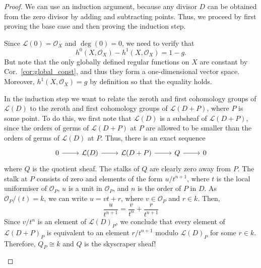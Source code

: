 \documentclass[12pt]{article}
\begin{document}
\begin{proof}
  We can use an induction argument, because any divisor $D$ can be
  obtained from the zero divisor by adding and subtracting points.
  Thus, we proceed by first proving the base case and then proving
  the induction step.

  \begin{description}[style=nextline]
    \item[base case$\big)$]
          Since $\mathcal{L}(0)=\mathscr{O}_{X}$ and $\deg(0)=0$,
          we need to verify that
          \[h^{0}(X, \mathscr{O}_{X})-h^{1}(X, \mathscr{O}_{X})=1-g.\]
          But note that the only globally defined regular functions
          on $X$ are constant by Cor.~\ref{cor:global_const},
          and thus they form a one-dimensional vector space.
          Moreover, $h^{1}(X, \mathscr{O}_{X})=g$ by definition
          so that the equality holds.
    \item[induction step$\big)$]
          In the induction step we want to relate the zeroth and first
          cohomology groups of $\mathcal{L}(D)$ to the zeroth and
          first cohomology groups of $\mathcal{L}(D+P)$, where
          $P$ is some point. To do this, we first note that
          $\mathcal{L}(D)$ is a subsheaf of $\mathcal{L}(D+P)$, since
          the orders of germs of $\mathcal{L}(D+P)$ at $P$ are allowed to
          be smaller than the orders of germs of $\mathcal{L}(D)$ at $P$.
          Thus, there is an exact sequence
          \[
          \begin{tikzcd}
            0\arrow{r} & \mathcal{L}(D)\arrow{r} & \mathcal{L}(D+P)\arrow{r}
            & Q\arrow{r} & 0
          \end{tikzcd}
          \]
          where $Q$ is the quotient sheaf. The stalks of $Q$ are clearly
          zero away from $P$. The stalk at $P$ consists of zero and
          elements of the form $u/t^{n+1}$, where $t$ is the local
          uniformiser of $\mathscr{O}_{P}$, $u$ is a unit in
          $\mathcal{O}_{P}$, and $n$ is the order of $P$ in $D$.
          As $\mathcal{O}_{P}/(t)=k$, we can write $u=vt+r$,
          where $v\in\mathcal{O}_{P}$ and $r\in k$.
          Then,
          \[\frac{u}{t^{n+1}}=\frac{v}{t^n}+\frac{r}{t^{n+1}}\]
          Since $v/t^n$ is an element of $\mathcal{L}(D)_{P}$, we conclude
          that every element of $\mathcal{L}(D+P)_{P}$ is equivalent to
          an element $r/t^{n+1}$ modulo $\mathcal{L}(D)_{P}$ for some
          $r\in k$. Therefore, $Q_{P}\cong k$ and $Q$ is the skyscraper sheaf!


\end{description}
\end{proof}
\end{document}
